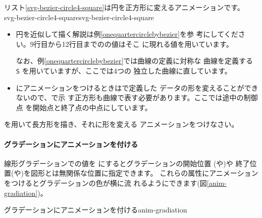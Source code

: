 リスト\ref{svg-bezier-circle4-square}は円を正方形に変えるアニメーションです。
%
{svg-bezier-circle4-square}{svg-bezier-circle4-square}
\begin{itemize}
\ifSummer\else
 \item 円を近似して描く解説は例\ref{onequartercirclebybezier}を参
       考にしてください。9行目から12行目までのの値はそこ
       に現れる値を用いています。

       なお、例\ref{onequartercirclebybezier}では曲線の定義に対称な
       \Bezier 曲線を定義する \texttt{S} を用いていますが、ここでは4つの
       独立した\Bezier 曲線に直しています。
\fi
 \item {}にアニメーションをつけるときはで定義した
       データの形を変えることができないので、で示
       す正方形も\Bezier 曲線で表す必要があります。ここでは途中の制御点
       を開始点と終了点の中点にしています。
\end{itemize}
\begin{Problem}
 を用いて長方形を描き、それに形を変える
 アニメーションをつけなさい。
\end{Problem}

\paragraph{グラデーションにアニメーションを付ける}
線形グラデーションでの値を
にするとグラデーションの開始位置
(や)や
終了位置(や)を図形とは無関係な位置に指定できます。
これらの属性にアニメーションをつけるとグラデーションの色が横に流
れるようにできます(図\ref{anim-gradiation})。

{グラデーションにアニメーションを付ける}{anim-gradiation} 

